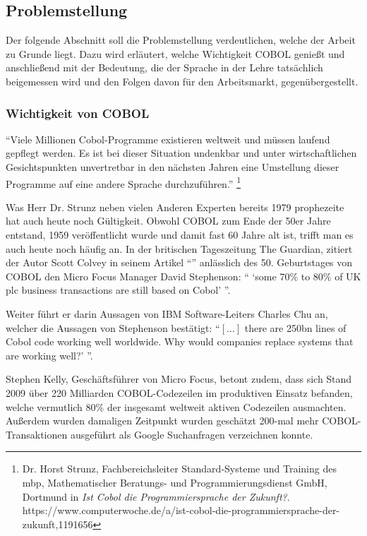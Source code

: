 \subsection{Problemstellung}\label{problemstellung}
Der folgende Abschnitt soll die Problemstellung verdeutlichen, welche der Arbeit zu Grunde liegt. 
Dazu wird erläutert, welche Wichtigkeit COBOL genießt und anschließend mit der Bedeutung, die der Sprache in der Lehre tatsächlich beigemessen wird und den Folgen davon für den Arbeitsmarkt, gegenübergestellt.

\subsubsection{Wichtigkeit von COBOL}
``Viele Millionen Cobol-Programme existieren weltweit und müssen laufend gepflegt werden.
Es ist bei dieser Situation undenkbar und unter wirtschaftlichen Gesichtspunkten unvertretbar in den nächsten Jahren eine Umstellung dieser Programme auf eine andere Sprache durchzuführen.'' \footnote{Dr. Horst Strunz, Fachbereichsleiter Standard-Systeme und Training des mbp, Mathematischer Beratungs- und Programmierungsdienst GmbH, Dortmund in \textit{Ist Cobol die Programmiersprache der Zukunft?}. \\ https://www.computerwoche.de/a/ist-cobol-die-programmiersprache-der-zukunft,1191656}

Was Herr Dr. Strunz neben vielen Anderen Experten bereits 1979 prophezeite hat auch heute noch Gültigkeit. Obwohl COBOL zum Ende der 50er Jahre entstand, 1959 veröffentlicht wurde und damit fast 60 Jahre alt ist, trifft man es auch heute noch häufig an. In der britischen Tageszeitung The Guardian, zitiert der Autor Scott Colvey in seinem Artikel ``'' \cite{colvey_cobol_2009} anlässlich des 50. Geburtstages von COBOL den Micro Focus Manager David Stephenson: `` `some 70\% to 80\% of UK plc business transactions are still based on Cobol' ''. 

Weiter führt er darin Aussagen von IBM Software-Leiters Charles Chu an, welcher die Aussagen von Stephenson bestätigt: ``$[\ldots]$ there are 250bn lines of Cobol code working well worldwide. Why would companies replace systems that are working well?' ''. 

Stephen Kelly, Geschäftsführer von Micro Focus, betont zudem, dass sich Stand 2009 über 220 Milliarden COBOL-Codezeilen im produktiven Einsatz befanden, welche vermutlich 80\% der insgesamt weltweit aktiven Codezeilen ausmachten. Außerdem wurden damaligen Zeitpunkt wurden geschätzt 200-mal mehr COBOL-Transaktionen ausgeführt als Google Suchanfragen verzeichnen konnte. \cite{kelly_cobol_2009}


